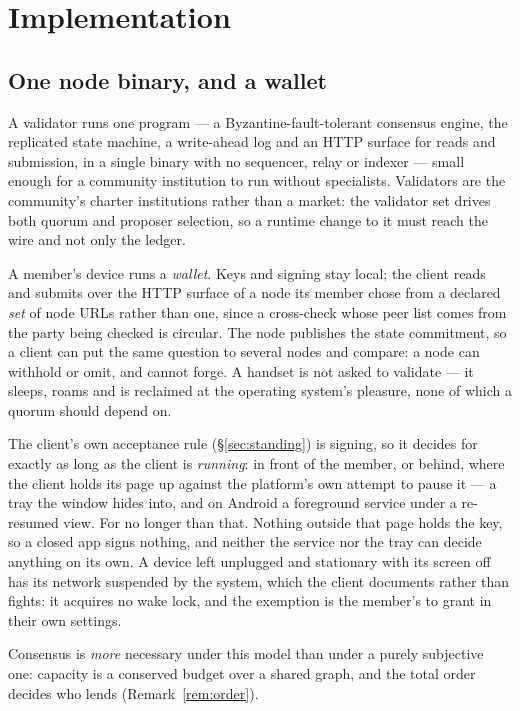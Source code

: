\section{Implementation}
\label{sec:implementation}

\subsection{One node binary, and a wallet}

A validator runs one program --- a Byzantine-fault-tolerant consensus engine, the
replicated state machine, a write-ahead log and an HTTP surface for reads and submission,
in a single binary with no sequencer, relay or indexer --- small enough for a community
institution to run without specialists. Validators are the community's charter
institutions rather than a market: the validator set drives both quorum and proposer
selection, so a runtime change to it must reach the wire and not only the ledger.

A member's device runs a \emph{wallet}. Keys and signing stay local; the client reads and
submits over the HTTP surface of a node its member chose from a declared \emph{set} of
node URLs rather than one, since a cross-check whose peer list comes from the party being
checked is circular. The node publishes the state commitment, so a client can put the same
question to several nodes and compare: a node can withhold or omit, and cannot forge. A
handset is not asked to validate --- it sleeps, roams and is reclaimed at the operating
system's pleasure, none of which a quorum should depend on.

The client's own acceptance rule (\S\ref{sec:standing}) is signing, so it decides for
exactly as long as the client is \emph{running}: in front of the member, or behind, where
the client holds its page up against the platform's own attempt to pause it --- a tray the
window hides into, and on Android a foreground service under a re-resumed view. For no
longer than that. Nothing outside that page holds the key, so a closed app signs nothing,
and neither the service nor the tray can decide anything on its own. A device left
unplugged and stationary with its screen off has its network suspended by the system,
which the client documents rather than fights: it acquires no wake lock, and the exemption
is the member's to grant in their own settings.

Consensus is \emph{more} necessary under this model than under a purely subjective one:
capacity is a conserved budget over a shared graph, and the total order decides who lends
(Remark~\ref{rem:order}).

